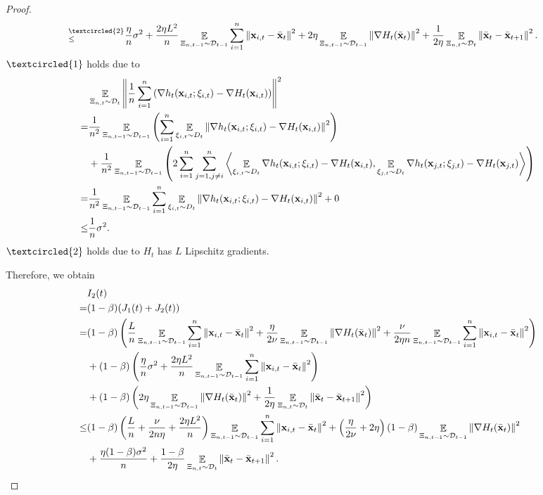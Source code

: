 \documentclass{article}
\begin{document}
\begin{proof}
\begin{align}
\refabovecir{\le}{\textcircled{2}} & \frac{\eta}{n} \sigma^2 + \frac{2\eta L^2}{n}\EE_{ \Xi_{n,t-1} \sim \Dcal_{t-1} }\sum_{i=1}^n \lrnorm{\x_{i,t} - \bar{\x}_t }^2 + 2\eta \EE_{ \Xi_{n,t-1} \sim \Dcal_{t-1} }\lrnorm{\nabla H_t(\bar{\x}_t)}^2 + \frac{1}{2\eta} \EE_{ \Xi_{n,t} \sim \Dcal_{t} }\lrnorm{ \bar{\x}_t - \bar{\x}_{t+1}}^2.
\end{align} $\textcircled{1}$ holds due to
\begin{align}
\nonumber
& \mathop{\mathbb{E}}_{ \Xi_{n,t} \sim \mathcal{D}_{t} }\left\lVert\frac{1}{n}\sum_{i=1}^n \left(  \nabla h_t({\bf x}_{i,t};\xi_{i,t}) - \nabla H_t({\bf x}_{i,t})  \right) \right\rVert^2 \\ \nonumber
= & \frac{1}{n^2}\mathop{\mathbb{E}}_{ \Xi_{n,t-1} \sim \mathcal{D}_{t-1} }\left(  \sum_{i=1}^n \mathop{\mathbb{E}}_{ \xi_{i,t} \sim D_t }\left\lVert \nabla h_t({\bf x}_{i,t};\xi_{i,t}) - \nabla H_t({\bf x}_{i,t}) \right\rVert^2   \right) \\ \nonumber 
& + \frac{1}{n^2}\mathop{\mathbb{E}}_{ \Xi_{n,t-1} \sim \mathcal{D}_{t-1} }\left( 2\sum_{i=1}^n\sum_{j=1, j\neq i}^n\left\langle \mathop{\mathbb{E}}_{ \xi_{i,t} \sim D_t }\nabla h_t({\bf x}_{i,t};\xi_{i,t}) - \nabla H_t({\bf x}_{i,t}),  \mathop{\mathbb{E}}_{ \xi_{j,t} \sim D_t } \nabla h_t({\bf x}_{j,t};\xi_{j,t}) - \nabla H_t({\bf x}_{j,t}) \right\rangle  \right) \\ \nonumber
= & \frac{1}{n^2}\mathop{\mathbb{E}}_{ \Xi_{n,t-1} \sim \mathcal{D}_{t-1} }\sum_{i=1}^n \mathop{\mathbb{E}}_{ \xi_{i,t} \sim D_t }\left\lVert \nabla h_t({\bf x}_{i,t};\xi_{i,t}) - \nabla H_t({\bf x}_{i,t}) \right\rVert^2 + 0 \\ \nonumber
\le & \frac{1}{n} \sigma^2.
\end{align} $\textcircled{2}$ holds due to $H_t$ has $L$ Lipschitz gradients.

 Therefore, we obtain
\begin{align}
\nonumber
& I_2(t) \\ \nonumber 
= & (1-\beta)(J_1(t) + J_2(t)) \\ \nonumber
= &  (1-\beta)\left(  \frac{L}{n}\mathop{\mathbb{E}}_{ \Xi_{n,t-1} \sim \mathcal{D}_{t-1} }\sum_{i=1}^n \left\lVert{\bf x}_{i,t} - \bar{{\bf x}}_t\right\rVert^2 + \frac{\eta}{2\nu}\mathop{\mathbb{E}}_{ \Xi_{n,t-1} \sim \mathcal{D}_{t-1} }\left\lVert\nabla H_t(\bar{{\bf x}}_t)\right\rVert^2 + \frac{\nu}{2\eta n}\mathop{\mathbb{E}}_{ \Xi_{n,t-1} \sim \mathcal{D}_{t-1} }\sum_{i=1}^n\left\lVert{\bf x}_{i,t} - \bar{{\bf x}}_t \right\rVert^2  \right) \\ \nonumber
& + (1-\beta)\left(  \frac{\eta}{n} \sigma^2 + \frac{2\eta L^2}{n}\mathop{\mathbb{E}}_{ \Xi_{n,t-1} \sim \mathcal{D}_{t-1} }\sum_{i=1}^n \left\lVert{\bf x}_{i,t} - \bar{{\bf x}}_t \right\rVert^2  \right) \\ \nonumber 
& + (1-\beta)\left(  2\eta \mathop{\mathbb{E}}_{ \Xi_{n,t-1} \sim \mathcal{D}_{t-1} }\left\lVert\nabla H_t(\bar{{\bf x}}_t)\right\rVert^2 + \frac{1}{2\eta} \mathop{\mathbb{E}}_{ \Xi_{n,t} \sim \mathcal{D}_{t} }\left\lVert \bar{{\bf x}}_t - \bar{{\bf x}}_{t+1}\right\rVert^2  \right) \\ \nonumber
\le &  (1-\beta)\left(  \frac{L}{n} + \frac{\nu}{2n\eta} + \frac{2\eta L^2}{n}  \right)\mathop{\mathbb{E}}_{ \Xi_{n,t-1} \sim \mathcal{D}_{t-1} }\sum_{i=1}^n\left\lVert{\bf x}_{i,t} - \bar{{\bf x}}_t \right\rVert^2   + \left(  \frac{\eta}{2\nu} + 2\eta  \right)(1-\beta)\mathop{\mathbb{E}}_{ \Xi_{n,t-1} \sim \mathcal{D}_{t-1} }\left\lVert\nabla H_t(\bar{{\bf x}}_t)\right\rVert^2 \\ \nonumber 
&+ \frac{\eta (1-\beta)\sigma^2}{n} +  \frac{1-\beta}{2\eta} \mathop{\mathbb{E}}_{ \Xi_{n,t} \sim \mathcal{D}_{t} }\left\lVert \bar{{\bf x}}_t - \bar{{\bf x}}_{t+1}\right\rVert^2.
\end{align}


\end{proof}
\end{document}
